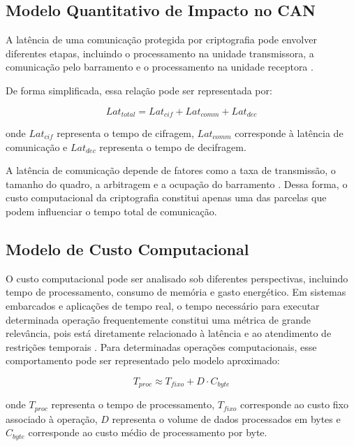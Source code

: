 \subsection{Modelo Quantitativo de Impacto no CAN}

A latência de uma comunicação protegida por criptografia pode envolver diferentes etapas, incluindo o processamento na unidade transmissora, a comunicação pelo barramento e o processamento na unidade receptora \cite{schmandt2017mini,wolf2006secure}.

De forma simplificada, essa relação pode ser representada por:

\begin{equation}
Lat_{total} = Lat_{cif} + Lat_{comm} + Lat_{dec}
\end{equation}

\noindent onde $Lat_{cif}$ representa o tempo de cifragem, $Lat_{comm}$ corresponde à latência de comunicação e $Lat_{dec}$ representa o tempo de decifragem.

A latência de comunicação depende de fatores como a taxa de transmissão, o tamanho do quadro, a arbitragem e a ocupação do barramento \cite{tindell1995calculating}. Dessa forma, o custo computacional da criptografia constitui apenas uma das parcelas que podem influenciar o tempo total de comunicação.

\subsection{Modelo de Custo Computacional}

O custo computacional pode ser analisado sob diferentes perspectivas, incluindo tempo de processamento, consumo de memória e gasto energético. Em sistemas embarcados e aplicações de tempo real, o tempo necessário para executar determinada operação frequentemente constitui uma métrica de grande relevância, pois está diretamente relacionado à latência e ao atendimento de restrições temporais \cite{jain2010art,hennessy2011computer}. Para determinadas operações computacionais, esse comportamento pode ser representado pelo modelo aproximado:

\begin{equation}
T_{proc} \approx T_{fixo} + D \cdot C_{byte}
\end{equation}

\noindent onde $T_{proc}$ representa o tempo de processamento, $T_{fixo}$ corresponde ao custo fixo associado à operação, $D$ representa o volume de dados processados em bytes e $C_{byte}$ corresponde ao custo médio de processamento por byte.

